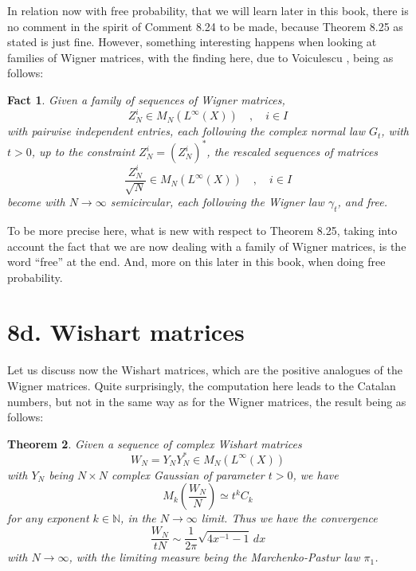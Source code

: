 \documentclass[12pt]{amsbook}
\newtheorem{theorem}{Theorem}[chapter]
\newtheorem{fact}[theorem]{Fact}
\begin{document}
\bigskip

In relation now with free probability, that we will learn later in this book, there is no comment in the spirit of Comment 8.24 to be made, because Theorem 8.25 as stated is just fine. However, something interesting happens when looking at families of Wigner matrices, with the finding here, due to Voiculescu \cite{vo3}, being as follows:

\begin{fact}
Given a family of sequences of Wigner matrices, 
$$Z^i_N\in M_N(L^\infty(X))\quad,\quad i\in I$$
with pairwise independent entries, each following the complex normal law $G_t$, with $t>0$, up to the constraint $Z_N^i=(Z_N^i)^*$, the rescaled sequences of matrices
$$\frac{Z^i_N}{\sqrt{N}}\in M_N(L^\infty(X))\quad,\quad i\in I$$
become with $N\to\infty$ semicircular, each following the Wigner law $\gamma_t$, and free.
\end{fact}

To be more precise here, what is new with respect to Theorem 8.25, taking into account the fact that we are now dealing with a family of Wigner matrices, is the word ``free'' at the end. And, more on this later in this book, when doing free probability.

\section*{8d. Wishart matrices}

Let us discuss now the Wishart matrices, which are the positive analogues of the Wigner matrices. Quite surprisingly, the computation here leads to the Catalan numbers, but not in the same way as for the Wigner matrices, the result being as follows:

\begin{theorem}
Given a sequence of complex Wishart matrices
$$W_N=Y_NY_N^*\in M_N(L^\infty(X))$$
with $Y_N$ being $N\times N$ complex Gaussian of parameter $t>0$, we have
$$M_k\left(\frac{W_N}{N}\right)\simeq t^kC_k$$
for any exponent $k\in\mathbb N$, in the $N\to\infty$ limit. Thus we have the convergence
$$\frac{W_N}{tN}\sim\frac{1}{2\pi}\sqrt{4x^{-1}-1}\,dx$$
with $N\to\infty$, with the limiting measure being the Marchenko-Pastur law $\pi_1$.
\end{theorem}
\end{document}
